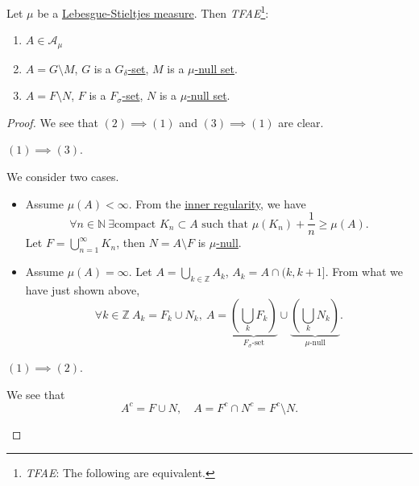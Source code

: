 \begin{theorem}
	Let \(\mu \) be a \hyperref[def:Lebesgue-Stieltjes-measure]{Lebesgue-Stieltjes measure}. Then \emph{TFAE}\footnote{\emph{TFAE}: The following are equivalent.}:
	\begin{enumerate}[(1)]
		\item \(A\in \mathcal{A} _\mu \)
		\item \(A = G\setminus M\), \(G\) is a \hyperref[def:G-delta-set]{\(G_{\delta}\)-set}, \(M\) is a \hyperref[def:mu-null-set]{\(\mu\)-null set}.
		\item \(A = F\setminus N\), \(F\) is a \hyperref[def:F-sigma-set]{\(F_{\sigma}\)-set}, \(N\) is a \hyperref[def:mu-null-set]{\(\mu\)-null set}.
	\end{enumerate}
\end{theorem}
\begin{proof}
	We see that \((2) \implies (1)\) and \((3)\implies (1)\) are clear.
	\begin{claim}
		\((1)\implies (3)\).
	\end{claim}
	\begin{explanation}
		We consider two cases.
		\begin{itemize}
			\item Assume \(\mu (A)<\infty \). From the \hyperref[thm:inner-regularity]{inner regularity}, we have
			      \[
				      \forall n\in\mathbb{N} \ \exists \text{compact }K_{n}\subset A\text{ such that } \mu (K_{n}) + \frac{1}{n} \geq \mu (A).
			      \]
			      Let \(F = \bigcup\limits_{n=1}^{\infty} K_{n}\), then \(N = A\setminus F\) is \hyperref[def:mu-null-set]{\(\mu\)-null}.
			\item Assume \(\mu (A) = \infty \). Let \(A = \bigcup\limits_{k\in\mathbb{Z} } A_{k}\), \(A_{k} = A\cap (k, k+1]\). From what we
			      have just shown above,
			      \[
				      \forall k\in\mathbb{Z}\ A_{k} = F_{k}\cup N_{k},\ A = \underbrace{\left(\bigcup\limits_{k}F_{k} \right)}_{\hyperref[def:F-sigma-set]{F_{\sigma}\text{-set}}}\cup \underbrace{\left(\bigcup\limits_{k}N_{k}\right)}_{\hyperref[def:mu-null-set]{\mu\text{-null}}}.
			      \]
		\end{itemize}
	\end{explanation}
	\begin{claim}
		\((1)\implies (2)\).
	\end{claim}
	\begin{explanation}
		We see that
		\[
			A^{c} = F\cup N,\quad A = F^{c} \cap N^{c} = F^{c} \setminus N.
		\]
	\end{explanation}
\end{proof}

